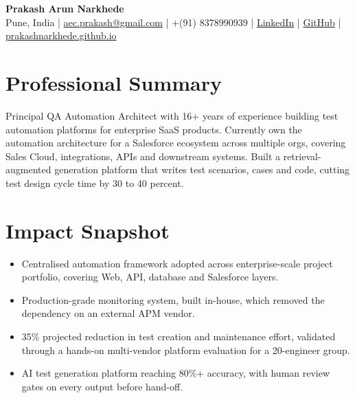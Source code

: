 \documentclass[11pt, a4paper]{article}
\begin{document}
\begin{center}
    {\LARGE\bfseries Prakash Arun Narkhede}\\[4pt]
    Pune, India \enspace|\enspace
    \href{mailto:aec.prakash@gmail.com}{aec.prakash@gmail.com} \enspace|\enspace
    +(91) 8378990939 \enspace|\enspace
    \href{https://www.linkedin.com/in/PrakashNarkhede89/}{LinkedIn} \enspace|\enspace
    \href{https://github.com/prakashnarkhede}{GitHub} \enspace|\enspace
    \href{https://prakashnarkhede.github.io}{prakashnarkhede.github.io}
\end{center}

\section{Professional Summary}

Principal QA Automation Architect with 16+ years of experience building test automation platforms for enterprise SaaS products.
Currently own the automation architecture for a Salesforce ecosystem across multiple orgs, covering Sales Cloud, integrations, APIs and downstream systems.
Built a retrieval-augmented generation platform that writes test scenarios, cases and code, cutting test design cycle time by 30 to 40 percent.

\section{Impact Snapshot}

\begin{itemize}
    \item Centralised automation framework adopted across enterprise-scale project portfolio, covering Web, API, database and Salesforce layers.
    \item Production-grade monitoring system, built in-house, which removed the dependency on an external APM vendor.
    \item 35\% projected reduction in test creation and maintenance effort, validated through a hands-on multi-vendor platform evaluation for a 20-engineer group.
    \item AI test generation platform reaching 80\%+ accuracy, with human review gates on every output before hand-off.
\end{itemize}
\end{document}
